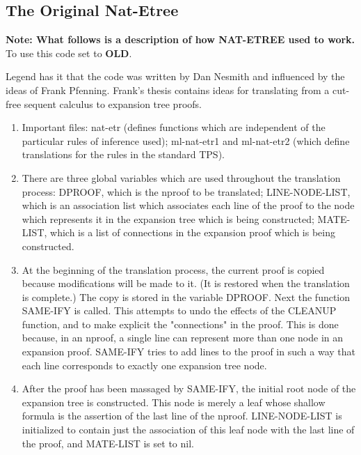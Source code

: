 \subsection{The Original Nat-Etree}

{\bf Note: What follows is a description of how NAT-ETREE used to work.}
To use this code set  to {\bf OLD}.

Legend has it that the code was written by Dan Nesmith and
influenced by the ideas of Frank Pfenning.  Frank's thesis
contains ideas for translating from a cut-free sequent calculus
to expansion tree proofs.

\begin{enumerate}
\item Important files: nat-etr (defines functions which are independent
of the particular rules of inference used); ml-nat-etr1 and
ml-nat-etr2 (which define translations for the rules in the standard TPS).

\item There are three global variables which are used throughout the
translation process: DPROOF, which is the nproof to
be translated; LINE-NODE-LIST, which is an association list which
associates each line of the proof to the node which represents it in
the expansion tree which is being constructed; MATE-LIST, which is a
list of connections in the expansion proof which is being constructed.

\item At the beginning of the translation process, the current proof is
copied because modifications will be made to it.  (It is restored when
the translation is complete.)  The copy is stored in the variable
DPROOF.  Next the function SAME-IFY is called.  This attempts to undo
the effects of the CLEANUP function, and to make explicit the
"connections" in the proof.  This is done because, in an nproof, 
a single line can represent more than one node in an
expansion proof.  SAME-IFY tries to add lines to the proof in such a
way that each line corresponds to exactly one expansion tree node.  

\item After the proof has been massaged by SAME-IFY, the initial root
node of the expansion tree is constructed.  This node is merely a
leaf whose shallow formula is the assertion of the last line of the
nproof.  LINE-NODE-LIST is initialized to contain
just the association of this leaf node with the last line of the
proof, and MATE-LIST is set to nil.


\end{enumerate}
